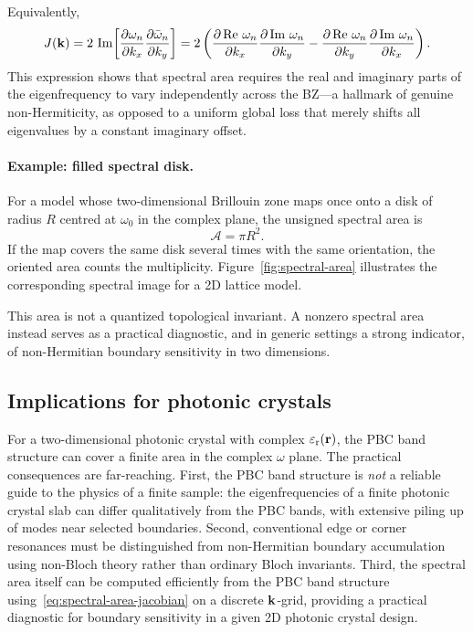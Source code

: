Equivalently,
\begin{equation}
 J(\mathbf{k}) = 2\,\operatorname{Im}\!\left[
 \frac{\partial \omega_n}{\partial k_x}
 \frac{\partial \bar{\omega}_n}{\partial k_y}\right]
 = 2\left(
 \frac{\partial \operatorname{Re}\,\omega_n}{\partial k_x}
 \frac{\partial \operatorname{Im}\,\omega_n}{\partial k_y}
 - \frac{\partial \operatorname{Re}\,\omega_n}{\partial k_y}
 \frac{\partial \operatorname{Im}\,\omega_n}{\partial k_x}
 \right).
 \label{eq:jacobian-berry}
\end{equation}
This expression shows that spectral area requires the real and
imaginary parts of the eigenfrequency to vary independently across the
BZ---a hallmark of genuine non-Hermiticity, as opposed to a uniform
global loss that merely shifts all eigenvalues by a constant imaginary
offset.

\paragraph{Example: filled spectral disk.}
For a model whose two-dimensional Brillouin zone maps once onto a disk
of radius $R$ centred at $\omega_0$ in the complex plane, the unsigned
spectral area is
\begin{equation}
 \mathcal{A} = \pi R^2.
 \label{eq:circular-area}
\end{equation}
If the map covers the same disk several times with the same orientation,
the oriented area counts the multiplicity. Figure~\ref{fig:spectral-area}
illustrates the corresponding spectral image for a 2D lattice model.

This area is not a quantized topological invariant. A nonzero spectral
area instead serves as a practical diagnostic, and in generic settings a
strong indicator, of non-Hermitian boundary sensitivity in two
dimensions.

\subsection{Implications for photonic crystals}
\label{ssec:2d-photonic}

For a two-dimensional photonic crystal with complex $\varepsilon_{\mathrm{r}}(\mathbf{r})$, the
PBC band structure can cover a finite area in the complex $\omega$
plane. The practical consequences are far-reaching. First, the PBC band
structure is
\emph{not} a reliable guide to the physics of a finite sample: the
eigenfrequencies of a finite photonic crystal slab can differ
qualitatively from the PBC bands, with extensive piling up of modes
near selected boundaries. Second, conventional edge or corner resonances
must be distinguished from non-Hermitian boundary accumulation using
non-Bloch theory rather than ordinary Bloch invariants. Third, the
spectral area itself can be computed efficiently from the PBC band
structure using~\eqref{eq:spectral-area-jacobian} on a discrete
$\mathbf{k}$-grid, providing a practical diagnostic for boundary sensitivity in
a given 2D photonic crystal design.


